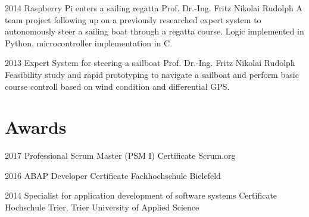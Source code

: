 \documentclass[]{friggeri-cv} %
\begin{document}
\begin{entrylist}
	
	\entry
	{2014}
	{Raspberry Pi enters a sailing regatta}
	{Prof. Dr.-Ing. Fritz Nikolai Rudolph}
	{A team project following up on a previously researched expert system to autonomously steer a sailing boat through a regatta course. Logic implemented in Python, microcontroller implementation in C.}
	
	
	\entry
	{2013}
	{Expert System for steering a sailboat}
	{Prof. Dr.-Ing. Fritz Nikolai Rudolph}
	{Feasibility study and rapid prototyping to navigate a sailboat and perform basic course controll based on wind condition and differential GPS.}
	
	
\end{entrylist}


\section{Awards}

\begin{entrylist}

	
	\entry
	{2017}
	{Professional Scrum Master (PSM I)}
	{Certificate}
	{Scrum.org}
	
	
	\entry
	{2016}
	{ABAP Developer}
	{Certificate}
	{Fachhochschule Bielefeld}
	
	
	\entry
	{2014}
	{Specialist for application development of software systems}
	{Certificate}
	{Hochschule Trier, Trier University of Applied Science}
	
	
	

\end{entrylist}
\end{document}
